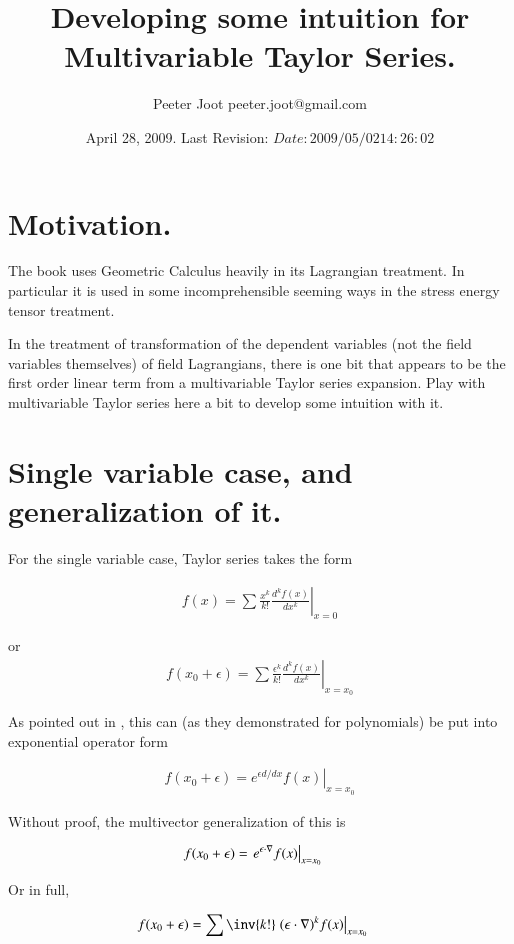\documentclass{article}
\title{ Developing some intuition for Multivariable Taylor Series. }
\author{Peeter Joot \quad peeter.joot@gmail.com }
\date{ April 28, 2009.  Last Revision: $Date: 2009/05/02 14:26:02 $ }
\begin{document}
\maketitle{}
\tableofcontents
\section{ Motivation. }

The book \cite{doran2003gap} uses Geometric Calculus heavily in its 
Lagrangian treatment.  In particular it is used in some incomprehensible seeming ways in the 
stress energy tensor treatment.

In the treatment of transformation of the dependent variables (not the field
variables themselves) of field Lagrangians, there is one bit that
appears to be the first order linear term from a multivariable Taylor
series expansion.  Play with multivariable Taylor series here a bit
to develop some intuition with it.

\section{ Single variable case, and generalization of it. }

For the single variable case, Taylor series takes the form

\begin{align}
f(x) = \sum \frac{x^k}{k!} \left. \frac{d^k f(x)}{dx^k} \right\vert_{x=0}
\end{align}

or
\begin{align}
f(x_0 + \epsilon) = \sum \frac{\epsilon^k}{k!} \left. \frac{d^k f(x)}{dx^k} \right\vert_{x=x_0}
\end{align}

As pointed out in \cite{byron1992mca}, this can (as they demonstrated for polynomials) be put into exponential 
operator form

\begin{align}
f(x_0 + \epsilon) = \left. e^{\epsilon d/dx} f(x) \right\vert_{x=x_0}
\end{align}

Without proof, the multivector generalization of this is

\begin{align}
f(x_0 + \epsilon) 
&= \left. e^{\epsilon \cdot \nabla} f(x) \right\vert_{x=x_0} 
\end{align}

Or in full,

\begin{align}\label{eqn:taylorMulti}
f(x_0 + \epsilon) 
&= \sum \inv{k!} \left. {(\epsilon \cdot \grad)^k} f(x) \right\vert_{x=x_0}
\end{align}
\end{document}
